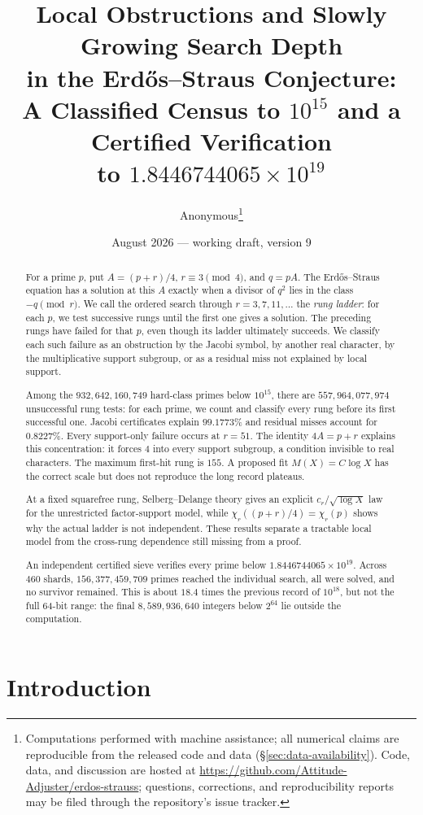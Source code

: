\documentclass[11pt]{article}
\title{Local Obstructions and Slowly Growing Search Depth\\
in the Erd\H{o}s--Straus Conjecture:\\
A Classified Census to $10^{15}$ and a Certified Verification\\
to $1.8446744065\times 10^{19}$}
\author{Anonymous\thanks{Computations performed with machine assistance; all numerical
claims are reproducible from the released code and data (\S\ref{sec:data-availability}).
Code, data, and discussion are hosted at
\url{https://github.com/Attitude-Adjuster/erdos-strauss}; questions, corrections, and
reproducibility reports may be filed through the repository's issue tracker.}}
\date{August 2026 --- working draft, version 9}
\theoremstyle{definition}
\theoremstyle{remark}
\begin{document}
\maketitle

\begin{abstract}
For a prime $p$, put $A=(p+r)/4$, $r\equiv3\pmod4$, and $q=pA$. The
Erd\H{o}s--Straus equation has a solution at this $A$ exactly when a divisor of $q^2$
lies in the class $-q\pmod r$. We call the ordered search through
$r=3,7,11,\ldots$ the \emph{rung ladder}: for each $p$, we test successive rungs until
the first one gives a solution. The preceding rungs have failed for that $p$, even
though its ladder ultimately succeeds. We classify each such failure as an obstruction
by the Jacobi symbol, by another real character, by the multiplicative support
subgroup, or as a residual miss not explained by local support.

Among the $932{,}642{,}160{,}749$ hard-class primes below $10^{15}$, there are
$557{,}964{,}077{,}974$ unsuccessful rung tests: for each prime, we count and classify
every rung before its first successful one. Jacobi certificates explain
$99.1773\%$ and residual misses account for $0.8227\%$. Every support-only failure
occurs at $r=51$. The identity $4A=p+r$ explains this concentration: it forces $4$
into every support subgroup, a condition invisible to real characters. The maximum
first-hit rung is $155$. A proposed fit $M(X)=C\log X$ has the correct scale but does
not reproduce the long record plateaus.

At a fixed squarefree rung, Selberg--Delange theory gives an explicit
$c_r/\sqrt{\log X}$ law for the unrestricted factor-support model, while
$\chi_r((p+r)/4)=\chi_r(p)$ shows why the actual ladder is not independent. These
results separate a tractable local model from the cross-rung dependence still missing
from a proof.

An independent certified sieve verifies every prime below
$1.8446744065\times10^{19}$. Across $460$ shards,
$156{,}377{,}459{,}709$ primes reached the individual search, all were solved, and no
survivor remained. This is about $18.4$ times the previous record of $10^{18}$, but not
the full 64-bit range: the final $8{,}589{,}936{,}640$ integers below $2^{64}$ lie
outside the computation.
\end{abstract}

\section{Introduction}\label{sec:intro}
\end{document}
